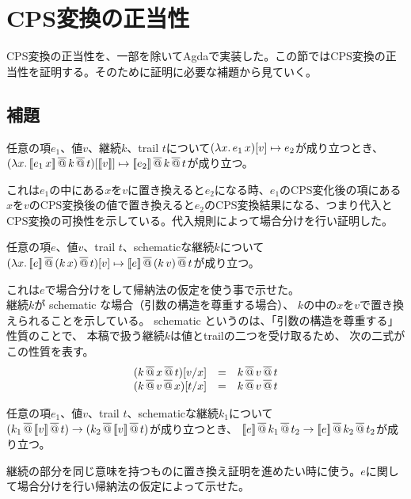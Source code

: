\section{CPS変換の正当性}
CPS変換の正当性を、一部を除いてAgdaで実装した。この節ではCPS変換の正当性を証明する。そのために証明に必要な補題から見ていく。
\subsection{補題}
\begin{lemma}[CPS変換と代入の可換性]\upshape
  任意の項$e_1$、値$v$、継続$k$、trail $t$について$\LamP{x}{e_1\,x}[v]\mapsto e_2$が成り立つとき、$\LamP{x}{\CPSTh{e_1\,x} \SAppS k \SAppS t}[\CPSTh{v}] \mapsto \CPSTh{e_2} \SAppS k \SAppS t$が成り立つ。
\label{eSubst}
\end{lemma}
これは$e_1$の中にある$x$を$v$に置き換えると$e_2$になる時、$e_1$のCPS変化後の項にある$x$を$v$のCPS変換後の値で置き換えると$e_2$のCPS変換結果になる、つまり代入とCPS変換の可換性を示している。代入規則によって場合分けを行い証明した。

\begin{lemma}[継続に関する代入演算]\upshape
  任意の項$e$、値$v$、trail $t$、schematicな継続$k$について\\
  $\LamP{x}{\CPSTh{e} \SAppS (k\, x) \SAppS t}[v] \mapsto \CPSTh{e} \SAppS (k\,v) \SAppS t$が成り立つ。
\label{kSubst}
\end{lemma}
これは$e$で場合分けをして帰納法の仮定を使う事で示せた。\\
継続$k$が schematic な場合（引数の構造を尊重する場合）、
$k$の中の$x$を$v$で置き換えられることを示している。
schematic \cite{DF1992}というのは、「引数の構造を尊重する」性質のことで、
本稿で扱う継続$k$は値とtrailの二つを受け取るため、
次の二式がこの性質を表す。\\
\[
\begin{array}{lcl}
  (k \SAppS x \SAppS t)[\Change{x}{v}] & = & k \SAppS v \SAppS t\\
  (k \SAppS v \SAppS x)[\Change{x}{t}] & = & k \SAppS v \SAppS t\\
\end{array}
\]

\begin{lemma}[継続の簡約に関する補題]\upshape
  任意の項$e_1$、値$v$、trail $t$、schematicな継続$k_1$について\\
  $(k_1 \SAppS \CPSTh{v} \SAppS t) \to (k_2 \SAppS \CPSTh{v} \SAppS t)$が成り立つとき、
  $\CPSTh{e}\SAppS k_1 \SAppS t_2 \to \CPSTh{e}\SAppS k_2 \SAppS t_2$が成り立つ。
\end{lemma}
継続の部分を同じ意味を持つものに置き換え証明を進めたい時に使う。$e$に関して場合分けを行い帰納法の仮定によって示せた。

